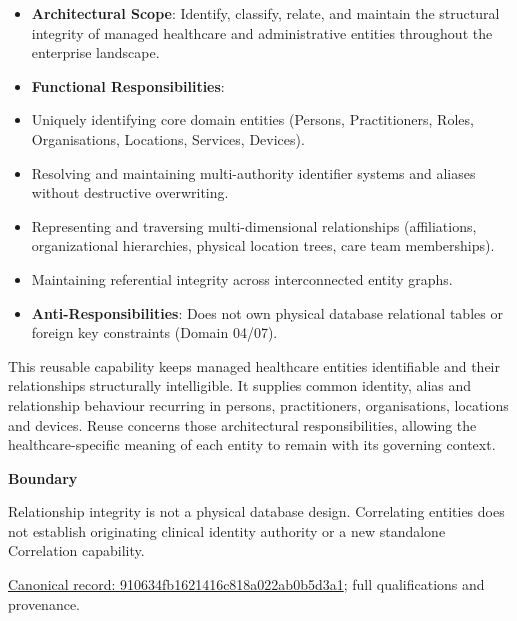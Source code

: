 \begin{itemize}


\item \textbf{Architectural Scope}: Identify, classify, relate, and maintain the structural integrity of managed healthcare and administrative entities throughout the enterprise landscape.

\item \textbf{Functional Responsibilities}:

\item Uniquely identifying core domain entities (Persons, Practitioners, Roles, Organisations, Locations, Services, Devices).

\item Resolving and maintaining multi-authority identifier systems and aliases without destructive overwriting.

\item Representing and traversing multi-dimensional relationships (affiliations, organizational hierarchies, physical location trees, care team memberships).

\item Maintaining referential integrity across interconnected entity graphs.

\item \textbf{Anti-Responsibilities}: Does not own physical database relational tables or foreign key constraints (Domain 04/07).

\end{itemize}


This reusable capability keeps managed healthcare entities identifiable and their relationships structurally intelligible. It supplies common identity, alias and relationship behaviour recurring in persons, practitioners, organisations, locations and devices. Reuse concerns those architectural responsibilities, allowing the healthcare-specific meaning of each entity to remain with its governing context.



\textbf{Boundary}



Relationship integrity is not a physical database design. Correlating entities does not establish originating clinical identity authority or a new standalone Correlation capability.


{\footnotesize \href{../../../../continuum/strategy/capability/910634fb1621416c818a022ab0b5d3a1.md}{Canonical record: 910634fb1621416c818a022ab0b5d3a1}; full qualifications and provenance.}\par
